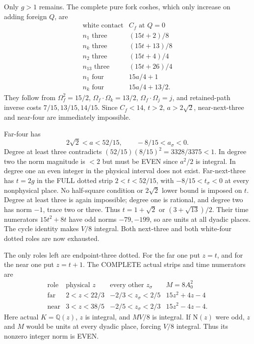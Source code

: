 Only \(g>1\) remains.
The complete pure fork coshes, which only increase
on adding foreign \(Q\), are
\[
\begin{array}{c|c}
 \text{white contact}&C_f\text{ at }Q=0\\ \hline
 n_1\text{ three}&(15t+2)/8\\
 n_k\text{ three}&(15t+13)/8\\
 n_2\text{ three}&(15t+4)/4\\
 n_{13}\text{ three}&(15t+26)/4\\
 n_1\text{ four}&15a/4+1\\
 n_k\text{ four}&15a/4+13/2 .
\end{array}
\]
They follow from
\(\Omega_f^2=15/2\),
\(\Omega_f\cdot\Omega_k=13/2\),
\(\Omega_f\cdot\Omega_j=j\),
and retained-path inverse costs
\(7/15,13/15,14/15\).
Since \(C_f<14\), \(t>2\), \(a>2\sqrt2\),
near-next-three and near-four are immediately impossible.

Far-four has
\[
            2\sqrt2<a<52/15,\qquad -8/15<a_\sigma<0.
\]
Degree at least three contradicts
\((52/15)(8/15)^2=3328/3375<1\).
In degree two the norm magnitude is \(<2\)
but must be EVEN since \(a^2/2\) is integral.
In degree one an even integer in the physical
interval does not exist.
Far-next-three has \(t=2g\) in the FULL dotted strip
\(2<t<52/15\), with \(-8/15<t_\sigma<0\)
at every nonphysical place.
No half-square condition or \(2\sqrt2\) lower bound
is imposed on \(t\).
Degree at least three is again impossible;
degree one is rational, and degree two has norm
\(-1\), trace two or three.
Thus \(t=1+\sqrt2\) or \((3+\sqrt{13})/2\).
Their time numerators \(15t^2+8t\) have odd norms
\(-79,-199\), so are units at all dyadic places.
The cycle identity makes \(V/8\) integral.
Both next-three and both white-four dotted roles
are now exhausted.

The only roles left are endpoint-three dotted.
For the far one put \(z=t\), and for the near one
put \(z=t+1\).
The COMPLETE actual strips and time numerators are
\[
\begin{array}{c|c|c|c}
 \text{role}&\text{physical }z&\text{every other }z_\sigma&M=8A_0^2\\ \hline
 \text{far}&2<z<22/3&-2/3<z_\sigma<2/5&15z^2+4z-4\\
 \text{near}&3<z<38/5&-2/5<z_\sigma<2/3&15z^2-4z-4 .
\end{array}
\]
Here actual \(K=\mathbb Q(z)\), \(z\) is integral,
and \(MV/8\) is integral.
If \(\mathrm N(z)\) were odd, \(z\) and \(M\)
would be units at every dyadic place, forcing
\(V/8\) integral.
Thus its nonzero integer norm is EVEN.

